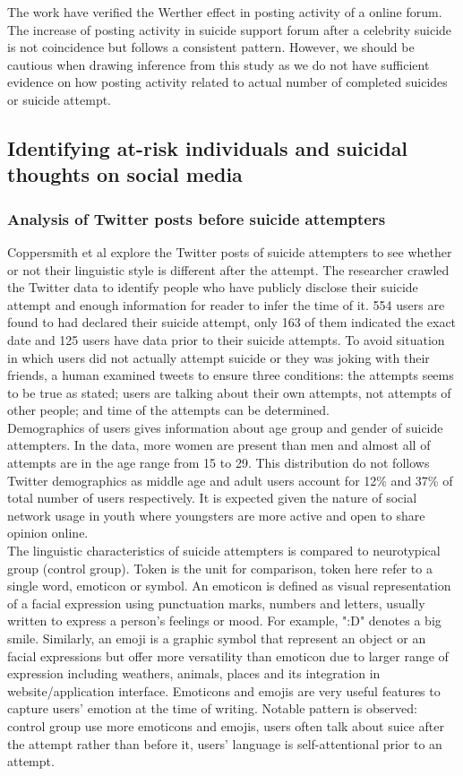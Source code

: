 The work have verified the Werther effect in posting activity of a online forum. The increase of posting activity in suicide support forum after a celebrity suicide is not coincidence but follows a consistent pattern. However, we should be cautious when drawing inference from this study as we do not have sufficient evidence on how posting activity related to actual number of completed suicides or suicide attempt.\\

\subsection{Identifying at-risk individuals and suicidal thoughts on social media}
\subsubsection*{Analysis of Twitter posts before suicide attempters}
Coppersmith et al \cite{Coppersmith2016} explore the Twitter posts of suicide attempters to see whether or not their linguistic style is different after the attempt. The researcher crawled the Twitter data to identify people who have publicly disclose their suicide attempt and enough information for reader to infer the time of it. 554 users are found to had declared their suicide attempt, only 163 of them indicated the exact date and 125 users have data prior to their suicide attempts. To avoid situation in which users did not actually attempt suicide or they was joking with their friends, a human examined tweets to ensure three conditions: the attempts seems to be true as stated; users are talking about their own attempts, not attempts of other people; and time of the attempts can be determined.\\
Demographics of users gives information about age group and gender of suicide attempters. In the data, more women are present than men and almost all of attempts are in the age range from 15 to 29. This distribution do not follows Twitter demographics as middle age and adult users account for 12\% and 37\% of total number of users respectively. It is expected given the nature of social network usage in youth where youngsters are more active and open to share opinion online.\\
The linguistic characteristics of suicide attempters is compared to neurotypical group (control group). Token is the unit for comparison, token here refer to a single word, emoticon or symbol. An emoticon is defined as visual representation of a facial expression using punctuation marks, numbers and letters, usually written to express a person's feelings or mood. For example, ":D" denotes a big smile. Similarly, an emoji is a graphic symbol that represent an object or an facial expressions but offer more versatility than emoticon due to larger range of expression including weathers, animals, places and its integration in website/application interface. Emoticons and emojis are very useful features to capture users' emotion at the time of writing. Notable pattern is observed: control group use more emoticons and emojis, users often talk about suice after the attempt rather than before it, users' language is self-attentional prior to an attempt.\\
